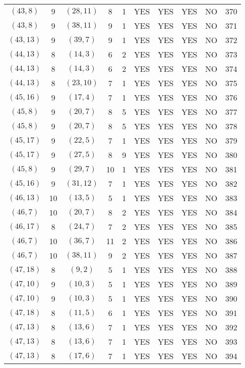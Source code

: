 \begin{longtable}{|c|c|c|c|c|c|c|c|c|c|}
$(43, 8)$ & 9 & $(28, 11)$ & 8 & 1 & YES & YES & YES & NO & 370\\
$(43, 8)$ & 9 & $(38, 11)$ & 9 & 1 & YES & YES & YES & NO & 371\\
$(43, 13)$ & 9 & $(39, 7)$ & 9 & 1 & YES & YES & YES & NO & 372\\
$(44, 13)$ & 8 & $(14, 3)$ & 6 & 2 & YES & YES & YES & NO & 373\\
$(44, 13)$ & 8 & $(14, 3)$ & 6 & 2 & YES & YES & YES & NO & 374\\
$(44, 13)$ & 8 & $(23, 10)$ & 7 & 1 & YES & YES & YES & NO & 375\\
$(45, 16)$ & 9 & $(17, 4)$ & 7 & 1 & YES & YES & YES & NO & 376\\
$(45, 8)$ & 9 & $(20, 7)$ & 8 & 5 & YES & YES & YES & NO & 377\\
$(45, 8)$ & 9 & $(20, 7)$ & 8 & 5 & YES & YES & YES & NO & 378\\
$(45, 17)$ & 9 & $(22, 5)$ & 7 & 1 & YES & YES & YES & NO & 379\\
$(45, 17)$ & 9 & $(27, 5)$ & 8 & 9 & YES & YES & YES & NO & 380\\
$(45, 8)$ & 9 & $(29, 7)$ & 10 & 1 & YES & YES & YES & NO & 381\\
$(45, 16)$ & 9 & $(31, 12)$ & 7 & 1 & YES & YES & YES & NO & 382\\
$(46, 13)$ & 10 & $(13, 5)$ & 5 & 1 & YES & YES & YES & NO & 383\\
$(46, 7)$ & 10 & $(20, 7)$ & 8 & 2 & YES & YES & YES & NO & 384\\
$(46, 17)$ & 8 & $(24, 7)$ & 7 & 2 & YES & YES & YES & NO & 385\\
$(46, 7)$ & 10 & $(36, 7)$ & 11 & 2 & YES & YES & YES & NO & 386\\
$(46, 7)$ & 10 & $(38, 11)$ & 9 & 2 & YES & YES & YES & NO & 387\\
$(47, 18)$ & 8 & $(9, 2)$ & 5 & 1 & YES & YES & YES & NO & 388\\
$(47, 10)$ & 9 & $(10, 3)$ & 5 & 1 & YES & YES & YES & NO & 389\\
$(47, 10)$ & 9 & $(10, 3)$ & 5 & 1 & YES & YES & YES & NO & 390\\
$(47, 18)$ & 8 & $(11, 5)$ & 6 & 1 & YES & YES & YES & NO & 391\\
$(47, 13)$ & 8 & $(13, 6)$ & 7 & 1 & YES & YES & YES & NO & 392\\
$(47, 13)$ & 8 & $(13, 6)$ & 7 & 1 & YES & YES & YES & NO & 393\\
$(47, 13)$ & 8 & $(17, 6)$ & 7 & 1 & YES & YES & YES & NO & 394\\

\end{longtable}
